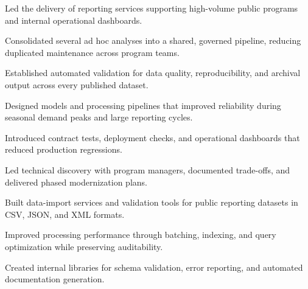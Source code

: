 \documentclass[fontsize=11pt, margin=narrow, medium=print]{careerdossier-resume}
\begin{document}
\MakeCDossierHeader


\begin{CDossierEntry}[title = {Principal Data Scientist}, organization = {Digital Services Laboratory}, location = {Ottawa, ON}, dates = {2024--Present}]
  \begin{CDossierItemize}
    \item Led the delivery of reporting services supporting high-volume public programs and internal operational dashboards.
    \item Consolidated several ad hoc analyses into a shared, governed pipeline, reducing duplicated maintenance across program teams.
    \item Established automated validation for data quality, reproducibility, and archival output across every published dataset.
  \end{CDossierItemize}
\end{CDossierEntry}
\begin{CDossierEntry}[title = {Senior Data Scientist}, organization = {Civic Technology Research Group}, location = {Toronto, ON}, dates = {2021--2024}]
  \begin{CDossierItemize}
    \item Designed models and processing pipelines that improved reliability during seasonal demand peaks and large reporting cycles.
    \item Introduced contract tests, deployment checks, and operational dashboards that reduced production regressions.
    \item Led technical discovery with program managers, documented trade-offs, and delivered phased modernization plans.
  \end{CDossierItemize}
\end{CDossierEntry}
\begin{CDossierEntry}[title = {Data Scientist}, organization = {Public Data Analytics Incorporated}, location = {Waterloo, ON}, dates = {2018--2021}]
  \begin{CDossierItemize}
    \item Built data-import services and validation tools for public reporting datasets in CSV, JSON, and XML formats.
    \item Improved processing performance through batching, indexing, and query optimization while preserving auditability.
    \item Created internal libraries for schema validation, error reporting, and automated documentation generation.
  \end{CDossierItemize}
\end{CDossierEntry}
\end{document}
